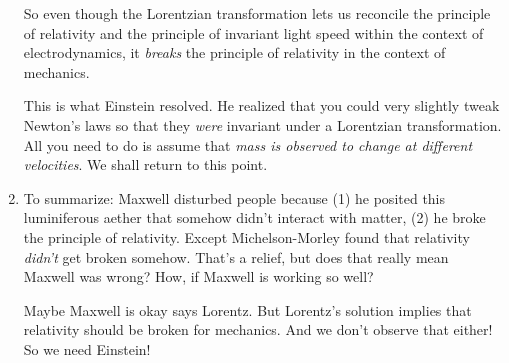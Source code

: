 \begin{enumerate}
  So even though the Lorentzian transformation lets us reconcile the
  principle of relativity and the principle of invariant light speed
  within the context of electrodynamics, it \emph{breaks} the principle
  of relativity in the context of mechanics.

  This is what Einstein resolved. He realized that you could very
  slightly tweak Newton's laws so that they \emph{were} invariant under
  a Lorentzian transformation. All you need to do is assume that
  \emph{mass is observed to change at different velocities}. We shall
  return to this point.

  \item To summarize: Maxwell disturbed people because (1) he posited
  this luminiferous aether that somehow didn't interact with matter, (2)
  he broke the principle of relativity. Except Michelson-Morley found
  that relativity \emph{didn't} get broken somehow. That's a relief, but
  does that really mean Maxwell was wrong? How, if Maxwell is working so
  well?

  Maybe Maxwell is okay says Lorentz. But Lorentz's solution implies
  that relativity should be broken for mechanics. And we don't observe
  that either! So we need Einstein!

\end{enumerate}
